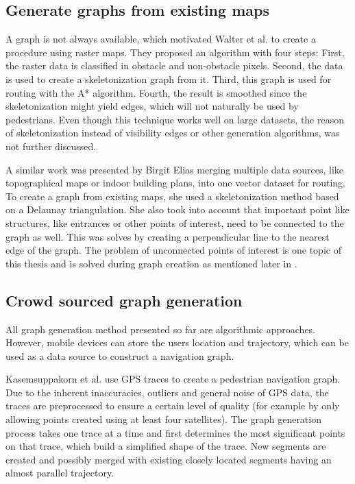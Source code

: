	\subsection{Generate graphs from existing maps}
	\label{subsection:generate-graphs-from-maps}
	
		A graph is not always available, which motivated Walter et al. to create a procedure using raster maps\cite{walter-raster-maps}.
		They proposed an algorithm with four steps:
		First, the raster data is classified in obstacle and non-obstacle pixels.
		Second, the data is used to create a skeletonization graph from it.
		Third, this graph is used for routing with the A* algorithm.
		Fourth, the result is smoothed since the skeletonization might yield edges, which will not naturally be used by pedestrians.
		Even though this technique works well on large datasets, the reason of skeletonization instead of visibility edges or other generation algorithms, was not further discussed.
		
		A similar work was presented by Birgit Elias merging multiple data sources, like topographical maps or indoor building plans, into one vector dataset for routing\cite{elias-tailored-geodatabase}.
		To create a graph from existing maps, she used a skeletonization method based on a Delaunay triangulation.
		She also took into account that important point like structures, like entrances or other points of interest, need to be connected to the graph as well.
		This was solves by creating a perpendicular line to the nearest edge of the graph.
		The problem of unconnected points of interest is one topic of this thesis and is solved during graph creation as mentioned later in .
		
	\subsection{Crowd sourced graph generation}
	
		All graph generation method presented so far are algorithmic approaches.
		However, mobile devices can store the users location and trajectory, which can be used as a data source to construct a navigation graph.
		
		Kasemsuppakorn et al. use GPS traces to create a pedestrian navigation graph\cite{kasemsuppakorn-gps-traces-pedestrain-network}.
		Due to the inherent inaccuracies, outliers and general noise of GPS data, the traces are preprocessed to ensure a certain level of quality (for example by only allowing points created using at least four satellites).
		The graph generation process takes one trace at a time and first determines the most significant points on that trace, which build a simplified shape of the trace.
		New segments are created and possibly merged with existing closely located segments having an almost parallel trajectory.
		
